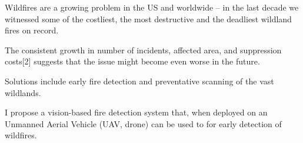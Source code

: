 
Wildfires are a growing problem in the US and worldwide -- 
in the last decade we witnessed some of the costliest, the most destructive and the deadliest wildland fires on record.

The consistent growth in number of incidents, affected area, and suppression costs[2] suggests that the issue
might become even worse in the future.

Solutions include early fire detection and preventative scanning of the vast wildlands.

I propose a vision-based fire detection system that, when deployed on an Unmanned Aerial Vehicle (UAV, drone) can be used to for early detection of wildfires. \cite{anastasiu-dsaa2016} %